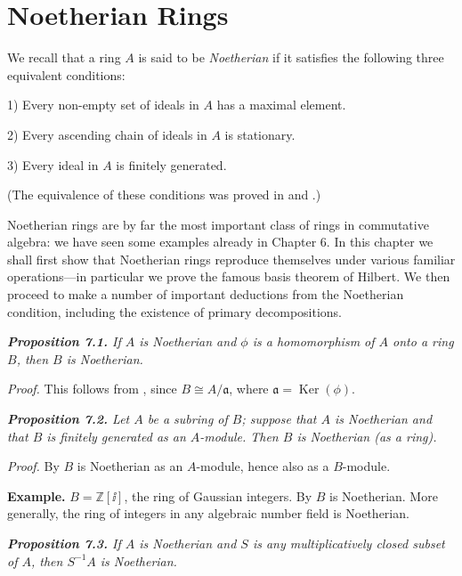 
\section{Noetherian Rings}

We recall that a ring $A$ is said to be \emph{Noetherian} if it satisfies the following three
equivalent conditions:

1) Every non-empty set of ideals in $A$ has a maximal element.

2) Every ascending chain of ideals in $A$ is stationary.

3) Every ideal in $A$ is finitely generated.

(The equivalence of these conditions was proved in  and .)

Noetherian rings are by far the most important class of rings in commutative
algebra: we have seen some examples already in Chapter 6.  In this chapter we
shall first show that Noetherian rings reproduce themselves under various
familiar operations---in particular we prove the famous basis theorem of Hilbert.
We then proceed to make a number of important deductions from the
Noetherian condition, including the existence of primary decompositions.

\medskip
\noindent\textit{\textbf{Proposition 7.1.} If $A$ is Noetherian and $\phi$ is a homomorphism of $A$ onto a
ring $B$, then $B$ is Noetherian.}

\noindent\emph{Proof.}  This follows from , since $B\cong A/\mathfrak a$, where $\mathfrak a=\operatorname{Ker}(\phi)$.\proofbox

\medskip
\noindent\textit{\textbf{Proposition 7.2.} Let $A$ be a subring of $B$; suppose that $A$ is Noetherian and
that $B$ is finitely generated as an $A$-module.  Then $B$ is Noetherian (as a ring).}

\noindent\emph{Proof.}  By  $B$ is Noetherian as an $A$-module, hence also as a $B$-module.\proofbox

\noindent\textbf{Example.}  $B=\mathbb Z[\ii]$, the ring of Gaussian integers.  By  $B$ is Noetherian.
More generally, the ring of integers in any algebraic number field is Noetherian.

\medskip
\noindent\textit{\textbf{Proposition 7.3.} If $A$ is Noetherian and $S$ is any multiplicatively closed
subset of $A$, then $S^{-1}A$ is Noetherian.}

